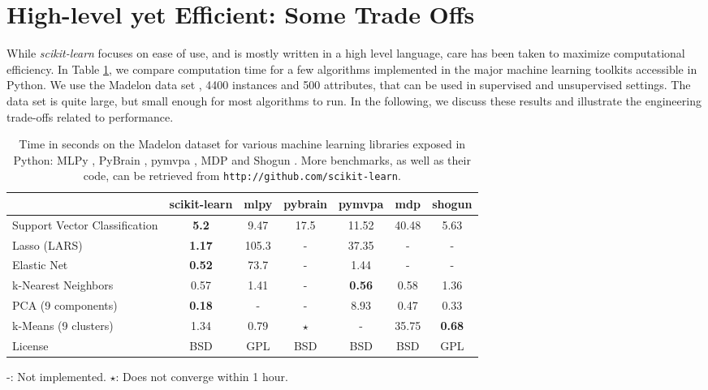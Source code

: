 \documentclass[twoside,11pt]{article}
\begin{document}
\section{High-level yet Efficient: Some Trade Offs}

While \emph{scikit-learn} focuses on ease of use, and is
mostly written in a high level language, care has been taken to maximize
computational efficiency. In Table \ref{tab:comparisons}, we compare
computation time for a few algorithms implemented in the major machine
learning toolkits accessible in Python. We use the Madelon data
set \citep{Guyon2004}, 4400 instances and 500 attributes,
that can be used in supervised
and unsupervised settings.  The data set is quite large, but small enough for most
algorithms to run.
In the following, we discuss these results and illustrate
the engineering trade-offs related to performance.

\begin{table}[t]
\small
\hspace*{.03\linewidth}%
\begin{tabular}{l c c c c c c}
\hline\hline %
 & scikit-learn & mlpy & pybrain & pymvpa &  mdp & shogun \\ [0.5ex]
\hline
Support Vector Classification & {\bf 5.2} & 9.47 & 17.5 & 11.52 & 40.48 & 5.63 \\
Lasso (LARS) & {\bf 1.17} & 105.3   & - &  37.35 & - & - \\
Elastic Net & {\bf 0.52} & 73.7 & -  &  1.44  & -  & - \\
k-Nearest Neighbors & 0.57 & 1.41 & - &  {\bf 0.56} & 0.58 & 1.36 \\
PCA (9 components) & {\bf 0.18} & - & - & 8.93  & 0.47 & 0.33 \\
k-Means (9 clusters) & 1.34 &  0.79 & $\star$ & -  & 35.75 & {\bf 0.68} \\
License &  BSD & GPL & BSD  &  BSD  & BSD  & GPL \\
\hline
\end{tabular}

-: Not implemented. \hfill
$\star$: Does not converge within 1 hour.

\vspace*{-1.5ex}
\caption{\small
Time in seconds on the Madelon dataset for various machine learning libraries exposed in Python:
MLPy \citep{albanese2008}, PyBrain \citep{schaul2010}, pymvpa
\citep{hanke2009}, MDP \citep{zito2008} and Shogun
\citep{sonnenburg2010}. 
More benchmarks, as well as their code, can be retrieved from {\tt http://github.com/scikit-learn}.
\vspace*{-1.5em}\label{tab:comparisons}
}
\end{table}
\end{document}
